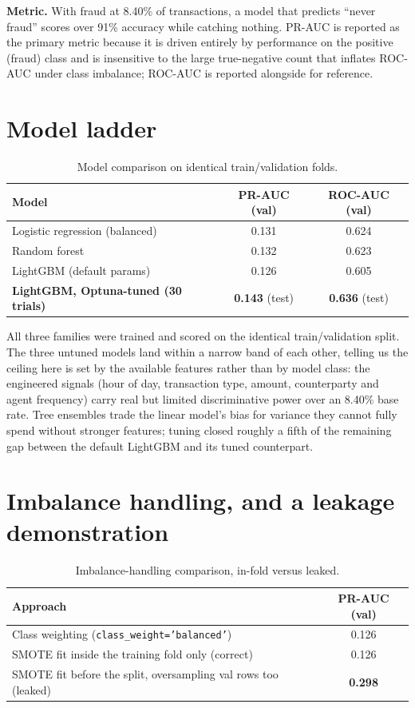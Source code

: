 \documentclass[11pt,a4paper]{article}
\begin{document}
\textbf{Metric.} With fraud at 8.40\% of transactions, a model that predicts ``never fraud'' scores over 91\% accuracy while catching nothing. PR-AUC is reported as the primary metric because it is driven entirely by performance on the positive (fraud) class and is insensitive to the large true-negative count that inflates ROC-AUC under class imbalance; ROC-AUC is reported alongside for reference.

\section{Model ladder}

\begin{table}[h!]
\centering
\caption{Model comparison on identical train/validation folds.}
\begin{tabular}{lcc}
\toprule
Model & PR-AUC (val) & ROC-AUC (val) \\
\midrule
Logistic regression (balanced) & 0.131 & 0.624 \\
Random forest & 0.132 & 0.623 \\
LightGBM (default params) & 0.126 & 0.605 \\
\textbf{LightGBM, Optuna-tuned (30 trials)} & \textbf{0.143} (test) & \textbf{0.636} (test) \\
\bottomrule
\end{tabular}
\end{table}

All three families were trained and scored on the identical train/validation split. The three untuned models land within a narrow band of each other, telling us the ceiling here is set by the available features rather than by model class: the engineered signals (hour of day, transaction type, amount, counterparty and agent frequency) carry real but limited discriminative power over an 8.40\% base rate. Tree ensembles trade the linear model's bias for variance they cannot fully spend without stronger features; tuning closed roughly a fifth of the remaining gap between the default LightGBM and its tuned counterpart.

\section{Imbalance handling, and a leakage demonstration}

\begin{table}[h!]
\centering
\caption{Imbalance-handling comparison, in-fold versus leaked.}
\begin{tabular}{lc}
\toprule
Approach & PR-AUC (val) \\
\midrule
Class weighting (\texttt{class\_weight='balanced'}) & 0.126 \\
SMOTE fit inside the training fold only (correct) & 0.126 \\
SMOTE fit before the split, oversampling val rows too (leaked) & \textbf{0.298} \\
\bottomrule
\end{tabular}
\end{table}
\end{document}

